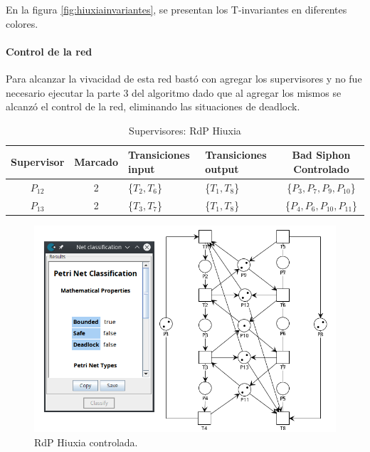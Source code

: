 En la figura \ref{fig:hiuxiainvariantes}, se presentan los T-invariantes en diferentes colores. \\

\paragraph{Control de la red}
\hfill \break
Para alcanzar la vivacidad de esta red bastó con agregar los supervisores y no fue necesario ejecutar la parte 3 del algoritmo dado que al agregar los mismos se alcanzó el control de la red, eliminando las situaciones de deadlock.

\begin{table}[H]
    \small
    \centering
    \begin{tabular}{|c|c|P{2cm}|P{2.3cm}|c|}
    \hline
    \textbf{Supervisor} & \textbf{Marcado} & \textbf{Transiciones input} & \textbf{Transiciones output} & \textbf{Bad Siphon Controlado}  \\  \hline
    $P_{12}$ & 2 & \{$T_{2},T_{6}$\} & \{$T_{1},T_{8}$\} & \{$P_3, P_7, P_9, P_{10}$\} \\ 
    \hline
    $P_{13}$ & 2 & \{$T_{3}, T_{7}$\} & \{$T_1,T_8$\} & \{$P_4, P_6, P_{10}, P_{11}$\} \\ 
    \hline
    \end{tabular}
    \caption{Supervisores: RdP Hiuxia}
    \label{tab:Hiuxia12-v4}
\end{table}
\hfill

\begin{figure}[H]
	\centering
	\includegraphics[width=\textwidth]{Figures/testing/hiuxia-controlada.png}
	\caption[RdP Hiuxia controlada]{RdP Hiuxia controlada.}
	\label{fig:hiuxiacontrolada}
 \end{figure} 
 
